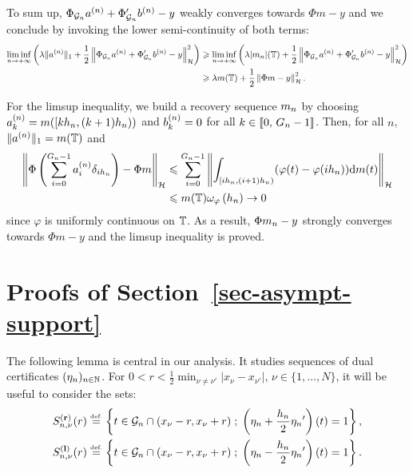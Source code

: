 To sum up, $\Phi_{\mathcal{G}_n}a^{(n)}+\Phi'_{\mathcal{G}_n}b^{(n)}-y$ weakly converges towards $\Phi m-y$ and we conclude by invoking the lower semi-continuity of both terms:
      \begin{align*}
        \liminf_{n\to +\infty}\left(\lambda \|a^{(n)}\|_1+\frac{1}{2}\left\lVert \Phi_{\mathcal{G}_n}a^{(n)}+\Phi'_{\mathcal{G}_n}b^{(n)}-y \right\rVert_{\mathcal{H}}^2\right) &\geqslant \liminf_{n\to +\infty}\left(\lambda | m_n |(\mathbb{T}) + \frac{1}{2}\left\lVert \Phi_{\mathcal{G}_n}a^{(n)}+\Phi'_{\mathcal{G}_n}b^{(n)}-y \right\rVert_{\mathcal{H}}^2\right)\\
        &\geqslant \lambda m(\mathbb{T}) + \frac{1}{2}\left\lVert \Phi m-y \right\rVert_{\mathcal{H}}^2.
      \end{align*}
 
      For the limsup inequality, we build a recovery sequence $m_n$ by choosing $a^{(n)}_k=m([k{h_n},(k+1){h_n}))$ and $b^{(n)}_k=0$ for all $k\in \llbracket 0,\,{G_n}-1 \rrbracket$. Then, for all $n$, $\|a^{(n)}\|_1=m(\mathbb{T})$ and 
        \begin{align*}
          \left\lVert \Phi\left(\sum_{i=0}^{{G_n}-1} a_{i}^{(n)} \delta_{i{h_n}}\right) -\Phi m \right\rVert_{\mathcal{H}}&\leqslant \sum_{i=0}^{{G_n}-1}\left\lVert \int_{[i{h_n},(i+1){h_n})}(\varphi(t)-\varphi(i{h_n}))\mathrm{d} m(t) \right\rVert_{\mathcal{H}}\\
                                                                                                             &\leqslant m(\mathbb{T})\omega_\varphi\left({h_n} \right)\to 0
        \end{align*}
since $\varphi$ is uniformly continuous on $\mathbb{T}$. As a result, $\Phi m_n-y$ strongly converges towards $\Phi m-y$ and the limsup inequality is proved.




  \section{Proofs of Section~\ref{sec-asympt-support}}
  \label{sec-apx-asympt-support}
  The following lemma is central in our analysis. It studies sequences of dual certificates $(\eta_n)_{n\in\mathbb{N}}$. For $0<r<\frac{1}{2} \min_{\nu\neq \nu'} |x_\nu - x_{\nu'}|$, $\nu\in\{1,\ldots,N\}$, it will be useful to consider the sets:
\begin{align*}
  S_{n,\nu}^{\mathbf{(r)}}(r)\stackrel{\mbox{\upshape\tiny def.}}{=}\left\{ t\in \mathcal{G}_n\cap(x_\nu-r,x_\nu+r) \;;\; \left(\eta_n+\frac{{h_n}}{2}{\eta_n}'\right)(t)=1 \right\},\\
  S_{n,\nu}^{\mathbf{(l)}}(r)\stackrel{\mbox{\upshape\tiny def.}}{=}\left\{ t\in \mathcal{G}_n\cap(x_\nu-r,x_\nu+r) \;;\; \left(\eta_n-\frac{{h_n}}{2}{\eta_n}'\right)(t)=1 \right\}.
\end{align*}



